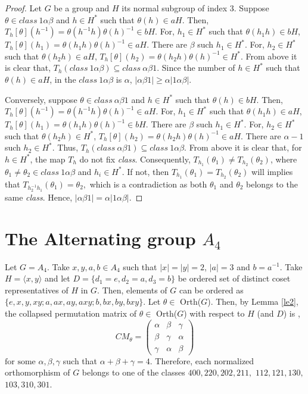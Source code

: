 \documentclass[11pt,a4paper]{article}
\theoremstyle{definition}
\theoremstyle{remark}
\begin{document}
	\begin{proof}
		Let $G$ be a group and $H$ its normal subgroup of index $3$. 
		Suppose $\theta \in class~1\alpha\beta$ and $h \in H^{\ast}$ such that $\theta(h) \in aH$. Then, $T_{h}[\theta](h^{-1}) = \theta(h^{-1}h)\theta(h)^{-1} \in bH$. For, $h_{1} \in H^{\ast}$ such that $\theta(h_{1}h) \in bH$, $T_{h}[\theta](h_{1}) = \theta(h_{1}h)\theta(h)^{-1} \in aH.$ There are $\beta$ such $h_{1} \in H^{\ast}$. For, $h_{2} \in H^{\ast}$ such that $\theta(h_{2}h) \in aH$, $T_{h}[\theta](h_{2}) = \theta(h_{2}h)\theta(h)^{-1} \in H^{\ast}$. From above it is clear that, $T_{h}(class~1\alpha\beta) \subseteq class~\alpha\beta1$. Since the number of $h \in H^{\ast}$ such that $\theta(h) \in aH$, in the $class~1\alpha\beta$ is $\alpha$,  $|\alpha\beta1| \geqslant \alpha|1\alpha\beta|.$
		
		Conversely, suppose $\theta \in class~\alpha\beta1$ and $h \in H^{\ast}$ such that $\theta(h) \in bH$. Then, $T_{h}[\theta](h^{-1}) = \theta(h^{-1}h)\theta(h)^{-1} \in aH.$ For, $h_{1} \in H^{\ast}$ such that $\theta(h_{1}h) \in aH$, $T_{h}[\theta](h_{1}) = \theta(h_{1}h)\theta(h)^{-1} \in bH$. There are $\beta$ such $h_{1} \in H^{\ast}$.  For, $h_{2} \in H^{\ast}$ such that $\theta(h_{2}h) \in H^{\ast}$, $T_{h}[\theta](h_{2}) = \theta(h_{2}h)\theta(h)^{-1} \in aH$. There are $\alpha-1$ such  $h_{2} \in H^{\ast}.$ Thus, $T_{h}(class~\alpha\beta1) \subseteq class~1\alpha\beta$. From above it is clear that, for $h \in H^{\ast}$, the map $T_{h}$ do not fix \textit{class}. Consequently, $T_{h_{1}}(\theta_{1}) \neq T_{h_{2}}(\theta_{2})$, where $\theta_{1}\neq\theta_{2} \in class~1\alpha\beta$ and  $h_{i} \in H^{\ast}$. If not, then $T_{h_{1}}(\theta_{1}) = T_{h_{2}}(\theta_{2})$ will implies that $T_{h_{2}^{-1}h_{1}}(\theta_{1}) = \theta_{2},$ which is a contradiction as both $\theta_{1}$ and $\theta_{2}$ belongs to the  same \textit{class}. Hence, $|\alpha \beta 1| = \alpha|1\alpha \beta|$.
	\end{proof}
	
	\section{The Alternating group $A_4$}
	Let $G = A_{4}$. Take $x,y,a,b \in A_{4}$ such that $\vert x \vert = \vert y \vert  = 2$, $\vert a \vert = 3$ and $b = a^{-1}$. Take $H = \langle x,y \rangle$ and let $D = \{d_{1}=e, d_{2}=a, d_{3}=b\}$ be ordered set  of distinct coset representatives of $H$ in $G$. Then, elements of $G$ can be ordered as $\{e,x,y,xy; a,ax,ay,axy; b,bx,by,bxy\}$. Let $\theta \in$ Orth($G$). Then, by Lemma \ref{le2}, the collapsed permutation matrix of $\theta \in$ Orth($G$) with respect to $H$ (and $D$) is ,  	$$ CM_{\theta} = \begin{pmatrix}
		\alpha&\beta&\gamma\\\beta&\gamma&\alpha\\\gamma&\alpha&\beta
	\end{pmatrix}$$ $\text{for some }\alpha,\beta,\gamma$ such that $\alpha+\beta+\gamma = 4$. Therefore,  each normalized orthomorphism of $G$ belongs to one of the classes $400, 220, 202, 211,$ $ 112, 121, 130,$ $ 103, 310, 301$.
	
\end{document}
